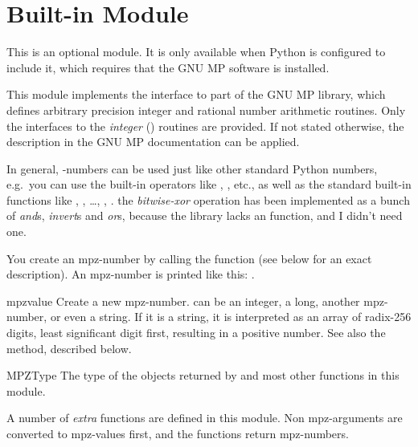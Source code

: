 \section{Built-in Module }



This is an optional module.  It is only available when Python is
configured to include it, which requires that the GNU MP software is
installed.

This module implements the interface to part of the GNU MP library,
which defines arbitrary precision integer and rational number
arithmetic routines.  Only the interfaces to the \emph{integer}
() routines are provided. If not stated
otherwise, the description in the GNU MP documentation can be applied.

In general, -numbers can be used just like other standard
Python numbers, e.g.\ you can use the built-in operators like \code{+},
\code{*}, etc., as well as the standard built-in functions like
, , \ldots, ,
.   the \emph{bitwise-xor}
operation has been implemented as a bunch of \emph{and}s,
\emph{invert}s and \emph{or}s, because the library lacks an
 function, and I didn't need one.

You create an mpz-number by calling the function  (see
below for an exact description). An mpz-number is printed like this:
.


\begin{funcdesc}{mpz}{value}
  Create a new mpz-number.  can be an integer, a long,
  another mpz-number, or even a string. If it is a string, it is
  interpreted as an array of radix-256 digits, least significant digit
  first, resulting in a positive number. See also the 
  method, described below.
\end{funcdesc}

\begin{datadesc}{MPZType}
  The type of the objects returned by  and most other
  functions in this module.
\end{datadesc}


A number of \emph{extra} functions are defined in this module. Non
mpz-arguments are converted to mpz-values first, and the functions
return mpz-numbers.

